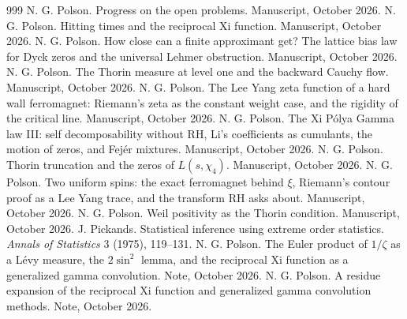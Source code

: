 \begin{thebibliography}{999}
 N. G. Polson. Progress on the open problems. Manuscript, October 2026.
 N. G. Polson. Hitting times and the reciprocal Xi function. Manuscript, October 2026.
 N. G. Polson. How close can a finite approximant get? The lattice bias law for Dyck zeros and the universal Lehmer obstruction. Manuscript, October 2026.
 N. G. Polson. The Thorin measure at level one and the backward Cauchy flow. Manuscript, October 2026.
 N. G. Polson. The Lee Yang zeta function of a hard wall ferromagnet: Riemann's zeta as the constant weight case, and the rigidity of the critical line. Manuscript, October 2026.
 N. G. Polson. The Xi P\'olya Gamma law III: self decomposability without RH, Li's coefficients as cumulants, the motion of zeros, and Fej\'er mixtures. Manuscript, October 2026.
 N. G. Polson. Thorin truncation and the zeros of $L(s,\chi_4)$. Manuscript, October 2026.
 N. G. Polson. Two uniform spins: the exact ferromagnet behind $\xi$, Riemann's contour proof as a Lee Yang trace, and the transform RH asks about. Manuscript, October 2026.
 N. G. Polson. Weil positivity as the Thorin condition. Manuscript, October 2026.
 J. Pickands. Statistical inference using extreme order statistics. \emph{Annals of Statistics} 3 (1975), 119--131.
 N. G. Polson. The Euler product of $1/\zeta$ as a L\'evy measure, the $2\sin^2$ lemma, and the reciprocal Xi function as a generalized gamma convolution. Note, October 2026.
 N. G. Polson. A residue expansion of the reciprocal Xi function and generalized gamma convolution methods. Note, October 2026.

\end{thebibliography}
